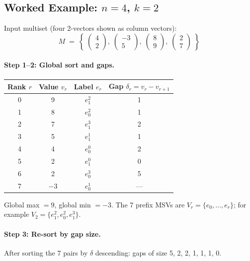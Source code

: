 \documentclass[11pt,a4paper]{article}
\newcommand{\eji}[2]{e^{#1}_{#2}}           %
\begin{document}
\subsection*{Worked Example: $n=4$, $k=2$}

Input multiset (four 2-vectors shown as column vectors):
\[
  M \;=\; \left\{\;
    \begin{pmatrix}4\\2\end{pmatrix},\;
    \begin{pmatrix}-3\\5\end{pmatrix},\;
    \begin{pmatrix}8\\9\end{pmatrix},\;
    \begin{pmatrix}2\\7\end{pmatrix}
  \;\right\}
\]

\paragraph{Step 1–2: Global sort and gaps.}
\begin{center}
\small
\renewcommand{\arraystretch}{1.2}
\begin{tabular}{cccc}
  \toprule
  Rank $r$ & Value $v_r$ & Label $e_r$ & Gap $\delta_r = v_r - v_{r+1}$ \\
  \midrule
  0 & 9 & $\eji{2}{1}$ & 1 \\
  1 & 8 & $\eji{2}{0}$ & 1 \\
  2 & 7 & $\eji{3}{1}$ & 2 \\
  3 & 5 & $\eji{1}{1}$ & 1 \\
  4 & 4 & $\eji{0}{0}$ & 2 \\
  5 & 2 & $\eji{0}{1}$ & 0 \\
  6 & 2 & $\eji{3}{0}$ & 5 \\
  7 & $-3$ & $\eji{1}{0}$ & — \\
  \bottomrule
\end{tabular}
\end{center}

\noindent
Global max $= 9$, global min $= {-3}$.
The 7 prefix MSVs are $V_r = \{e_0, \ldots, e_r\}$; for example
$V_2 = \{\eji{2}{1}, \eji{2}{0}, \eji{3}{1}\}$.

\paragraph{Step 3: Re-sort by gap size.}
After sorting the 7 pairs by $\delta$ descending: gaps of size 5, 2, 2, 1, 1, 1, 0.
\end{document}
